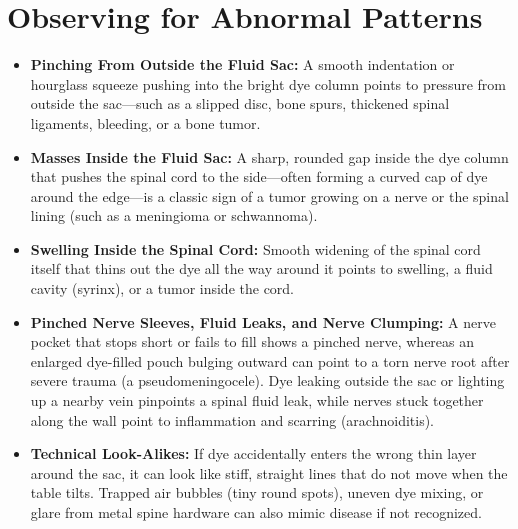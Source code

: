 \section{Observing for Abnormal Patterns}
\begin{itemize}
    \item \textbf{Pinching From Outside the Fluid Sac:} A smooth indentation or hourglass squeeze pushing into the bright dye column points to pressure from outside the sac---such as a slipped disc, bone spurs, thickened spinal ligaments, bleeding, or a bone tumor.
    \item \textbf{Masses Inside the Fluid Sac:} A sharp, rounded gap inside the dye column that pushes the spinal cord to the side---often forming a curved cap of dye around the edge---is a classic sign of a tumor growing on a nerve or the spinal lining (such as a meningioma or schwannoma).
    \item \textbf{Swelling Inside the Spinal Cord:} Smooth widening of the spinal cord itself that thins out the dye all the way around it points to swelling, a fluid cavity (syrinx), or a tumor inside the cord.
    \item \textbf{Pinched Nerve Sleeves, Fluid Leaks, and Nerve Clumping:} A nerve pocket that stops short or fails to fill shows a pinched nerve, whereas an enlarged dye-filled pouch bulging outward can point to a torn nerve root after severe trauma (a pseudomeningocele). Dye leaking outside the sac or lighting up a nearby vein pinpoints a spinal fluid leak, while nerves stuck together along the wall point to inflammation and scarring (arachnoiditis).
    \item \textbf{Technical Look-Alikes:} If dye accidentally enters the wrong thin layer around the sac, it can look like stiff, straight lines that do not move when the table tilts. Trapped air bubbles (tiny round spots), uneven dye mixing, or glare from metal spine hardware can also mimic disease if not recognized.
\end{itemize}

